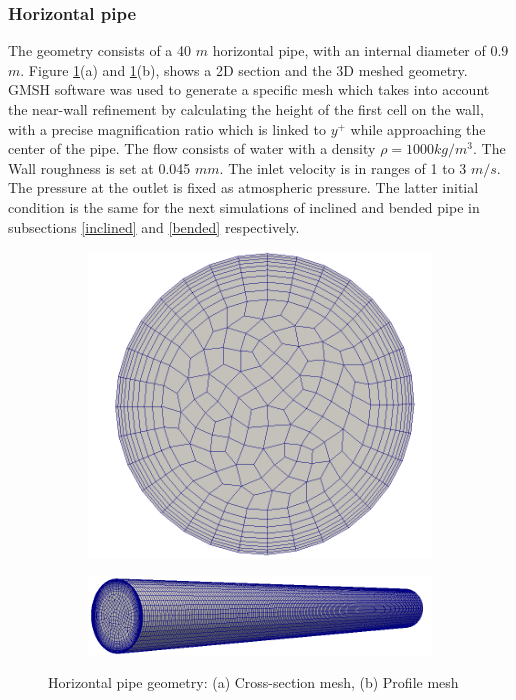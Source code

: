 \documentclass[11pt]{report}
\begin{document}
\subsubsection{Horizontal pipe}
%
The geometry consists of a 40 $m$ horizontal pipe, with an internal diameter of 0.9 $m$. 
%
Figure \ref{horiz}(a) and \ref{horiz}(b), shows a 2D section and the 3D meshed geometry. 
%
GMSH software was used to generate a specific mesh which takes into account the near-wall refinement by calculating the height of the first cell on the wall, with a precise magnification ratio which is linked to $y^{+}$ while approaching the center of the pipe. 
%
The flow consists of water with a density $\rho=1000 kg/m^3$. 
%
The Wall roughness is set at 0.045 $mm$. The inlet velocity is in ranges of 1 to 3 $m/s$. 
%
The pressure at the outlet is fixed as atmospheric pressure. The latter initial condition is the same for the next simulations of inclined and bended pipe in subsections \ref{inclined} and \ref{bended} respectively.
%
\begin{figure}[ht!]
\centering
\begin{subfigure}{0.40\textwidth}\centering 
\includegraphics[scale=0.09]{figs/section.png}
\caption{}
\end{subfigure}
% 
\begin{subfigure}{0.40\textwidth}\centering 
\includegraphics[scale = 0.25]{figs/HP-2.png}
\caption{}
\end{subfigure}
\caption{Horizontal pipe geometry: (a) Cross-section mesh, (b) Profile mesh }
\label{horiz}
\end{figure}
\end{document}
